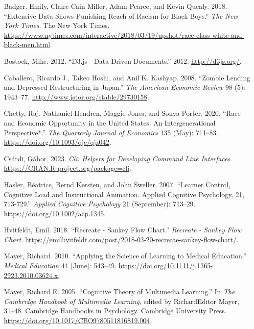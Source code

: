 \hypertarget{refs}{}
\begin{CSLReferences}{1}{0}
\leavevmode{}%
Badger, Emily, Claire Cain Miller, Adam Pearce, and Kevin Quealy. 2018. {``Extensive Data Shows Punishing Reach of Racism for Black Boys.''} \emph{The New York Times}. The New York Times. \url{https://www.nytimes.com/interactive/2018/03/19/upshot/race-class-white-and-black-men.html}.

\leavevmode{}%
Bostock, Mike. 2012. {``D3.js - Data-Driven Documents.''} 2012. \url{http://d3js.org/}.

\leavevmode{}%
Caballero, Ricardo J., Takeo Hoshi, and Anil K. Kashyap. 2008. {``Zombie Lending and Depressed Restructuring in {J}apan.''} \emph{The American Economic Review} 98 (5): 1943--77. \url{http://www.jstor.org/stable/29730158}.

\leavevmode{}%
Chetty, Raj, Nathaniel Hendren, Maggie Jones, and Sonya Porter. 2020. {``Race and Economic Opportunity in the United States: An Intergenerational Perspective*.''} \emph{The Quarterly Journal of Economics} 135 (May): 711--83. \url{https://doi.org/10.1093/qje/qjz042}.

\leavevmode{}%
Csárdi, Gábor. 2023. \emph{Cli: Helpers for Developing Command Line Interfaces}. \url{https://CRAN.R-project.org/package=cli}.

\leavevmode{}%
Hasler, Béatrice, Bernd Kersten, and John Sweller. 2007. {``Learner Control, Cognitive Load and Instructional Animation. Applied Cognitive Psychology, 21, 713-729.''} \emph{Applied Cognitive Psychology} 21 (September): 713--29. \url{https://doi.org/10.1002/acp.1345}.

\leavevmode{}%
Hvitfeldt, Emil. 2018. {``Recreate - Sankey Flow Chart.''} \emph{Recreate - Sankey Flow Chart}. \url{https://emilhvitfeldt.com/post/2018-03-20-recreate-sankey-flow-chart/}.

\leavevmode{}%
Mayer, Richard. 2010. {``Applying the Science of Learning to Medical Education.''} \emph{Medical Education} 44 (June): 543--49. \url{https://doi.org/10.1111/j.1365-2923.2010.03624.x}.

\leavevmode{}%
Mayer, Richard E. 2005. {``Cognitive Theory of Multimedia Learning.''} In \emph{The Cambridge Handbook of Multimedia Learning}, edited by RichardEditor Mayer, 31--48. Cambridge Handbooks in Psychology. Cambridge University Press. \url{https://doi.org/10.1017/CBO9780511816819.004}.


\end{CSLReferences}
